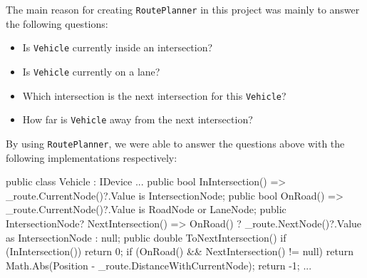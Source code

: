 The main reason for creating \verb*|RoutePlanner| in this project was mainly to answer the following questions:
\begin{itemize}
	\item Is \verb*|Vehicle| currently inside an intersection?
	\item Is \verb*|Vehicle| currently on a lane?
	\item Which intersection is the next intersection for this \verb*|Vehicle|?
	\item How far is \verb*|Vehicle| away from the next intersection?
\end{itemize}
By using \verb*|RoutePlanner|, we were able to answer the questions above with the following implementations respectively:
\begin{csharp}
public class Vehicle : IDevice
{
	...
	public bool InIntersection() => 
		_route.CurrentNode()?.Value is IntersectionNode;
	public bool OnRoad() => 
		_route.CurrentNode()?.Value is RoadNode or LaneNode;
	public IntersectionNode? NextIntersection() =>
		OnRoad() ? _route.NextNode()?.Value as IntersectionNode : null;
	public double ToNextIntersection()
	{
		if (InIntersection())
			return 0;
		if (OnRoad() && NextIntersection() != null)
			return Math.Abs(Position - _route.DistanceWithCurrentNode);
		return -1;
	}
	...
}
\end{csharp}

